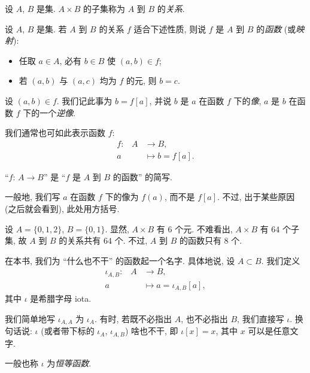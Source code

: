 \begin{definition}
    设 $A$, $B$ 是集. $A \times B$ 的子集称为 $A$ 到 $B$ 的\emph{关系}.
\end{definition}

\begin{definition}
    设 $A$, $B$ 是集. 若 $A$ 到 $B$ 的关系 $f$ 适合下述性质, 则说 $f$ 是 $A$ 到 $B$ 的\emph{函数} (或\emph{映射}):
    \begin{itemize}
        \item 任取 $a \in A$, 必有 $b \in B$ 使 $(a,b) \in f$;
        \item 若 $(a,b)$ 与 $(a,c)$ 均为 $f$ 的元, 则 $b = c$.
    \end{itemize}
    设 $(a,b) \in f$. 我们记此事为 $b = f[a]$, 并说 $b$ 是 $a$ 在函数 $f$ 下的\emph{像}, $a$ 是 $b$ 在函数 $f$ 下的一个\emph{逆像}.

    我们通常也可如此表示函数 $f$:
    \begin{align*}
        \text{$f$:} \quad
        A & \to B,            \\
        a & \mapsto b = f[a].
    \end{align*}

    ``$f$: $A \to B$'' 是 ``$f$ 是 $A$ 到 $B$ 的函数'' 的简写.
\end{definition}

\begin{remark}
    一般地, 我们写 $a$ 在函数 $f$ 下的像为 $f(a)$, 而不是 $f[a]$. 不过, 出于某些原因 (之后就会看到), 此处用方括号.
\end{remark}

\begin{example}
    设 $A = \{ 0,1,2 \}$, $B = \{ 0,1 \}$. 显然, $A \times B$ 有 $6$ 个元. 不难看出, $A \times B$ 有 $64$ 个子集, 故 $A$ 到 $B$ 的关系共有 $64$ 个. 不过, $A$ 到 $B$ 的函数只有 $8$ 个.
\end{example}

\begin{definition}
    在本书, 我们为 ``什么也不干'' 的函数起一个名字. 具体地说, 设 $A \subset B$. 我们定义
    \begin{align*}
        \text{$\iota_{A,B}$:} \quad
        A & \to B,                       \\
        a & \mapsto a = \iota_{A,B} [a],
    \end{align*}
    其中 $\iota$ 是希腊字母 iota.

    我们简单地写 $\iota_{A,A}$ 为 $\iota_{A}$. 有时, 若既不必指出 $A$, 也不必指出 $B$, 我们直接写 $\iota$. 换句话说: $\iota$ (或者带下标的 $\iota_{A}$, $\iota_{A,B}$) 啥也不干, 即 $\iota[x] = x$, 其中 $x$ 可以是任意文字.

    一般也称 $\iota$ 为\emph{恒等函数}.
\end{definition}

